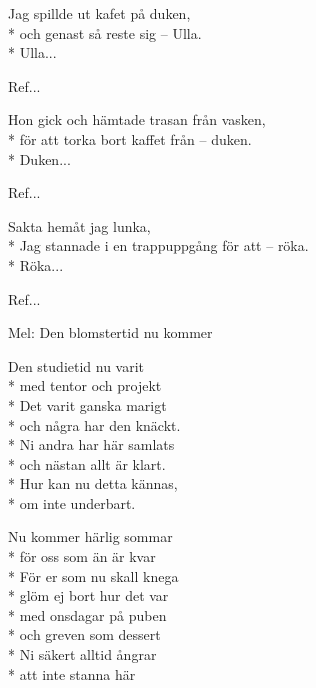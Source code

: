\begin{SongText}
    \begin{SongVerse}
        Jag spillde ut kafet på duken,\\*%
        och genast så reste sig – Ulla.\\*%
        Ulla...
    \end{SongVerse}
    \begin{SongVerse}
        Ref...
    \end{SongVerse}
    \begin{SongVerse}
        Hon gick och hämtade trasan från vasken,\\*%
        för att torka bort kaffet från – duken.\\*%
        Duken...
    \end{SongVerse}
    \begin{SongVerse}
        Ref...
    \end{SongVerse}
    \begin{SongVerse}
        Sakta hemåt jag lunka,\\*%
        Jag stannade i en trappuppgång för att – röka.\\*%
        Röka...
    \end{SongVerse}
    \begin{SongVerse}
        Ref...
    \end{SongVerse}
\end{SongText}
\begin{SongText}[Avslutningssången]
    \begin{SongInfo}
        Mel: Den blomstertid nu kommer
    \end{SongInfo}
    \begin{SongVerse}
        Den studietid nu varit\\*%
        med tentor och projekt\\*%
        Det varit ganska marigt\\*%
        och några har den knäckt.\\*%
        Ni andra har här samlats\\*%
        och nästan allt är klart.\\*%
        Hur kan nu detta kännas,\\*%
        om inte underbart.
    \end{SongVerse}
    \begin{SongVerse}
        Nu kommer härlig sommar\\*%
        för oss som än är kvar\\*%
        För er som nu skall knega\\*%
        glöm ej bort hur det var\\*%
        med onsdagar på puben\\*%
        och greven som dessert\\*%
        Ni säkert alltid ångrar\\*%
        att inte stanna här
    \end{SongVerse}
\end{SongText}
